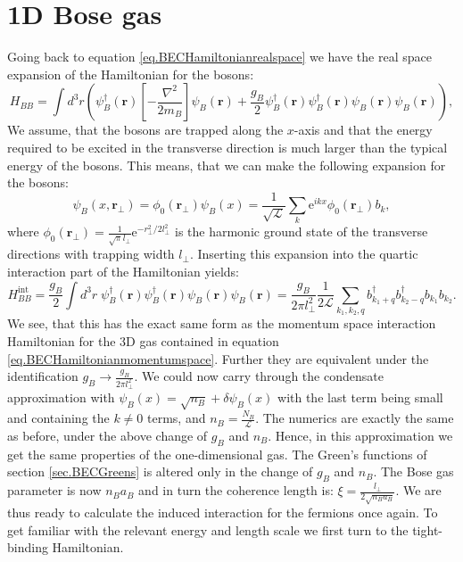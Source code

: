 \section{1D Bose gas} \label{sec.1DBosegas}
Going back to equation \eqref{eq.BECHamiltonianrealspace} we have the real space expansion of the Hamiltonian for the bosons:
\begin{equation}
H_{BB} = \int d^3 r \left(\psi_B^\dagger(\mathbf{r})\left[-\frac{\nabla^2}{2m_B}\right]\psi_B(\mathbf{r}) + \frac{g_B}{2}\psi_B^\dagger(\mathbf{r})\psi_B^\dagger(\mathbf{r})\psi_B(\mathbf{r})\psi_B(\mathbf{r})  \right), \nonumber
\end{equation}
We assume, that the bosons are trapped along the $x$-axis and that the energy required to be excited in the transverse direction is much larger than the typical energy of the bosons. This means, that we can make the following expansion for the bosons:
\begin{equation}
\psi_B(x, \mathbf{r}_{\perp}) = \phi_0(\mathbf{r}_{\perp}) \psi_B(x) = \frac{1}{\sqrt{\mathcal{L}}} \sum_k \text{e}^{ikx} \phi_0(\mathbf{r}_{\perp}) b_k, 
\nonumber
\end{equation}
where $\phi_0(\mathbf{r}_\perp) = \frac{1}{\sqrt{\pi}l_{\perp}}\text{e}^{-r_{\perp}^2/2l_{\perp}^2}$ is the harmonic ground state of the transverse directions with trapping width $l_{\perp}$. Inserting this expansion into the quartic interaction part of the Hamiltonian yields:
\begin{equation}
H_{BB}^{\text{int}} = \frac{g_B}{2}\int d^3 r \; \psi_B^\dagger(\mathbf{r})\psi_B^\dagger(\mathbf{r})\psi_B(\mathbf{r})\psi_B(\mathbf{r}) = \frac{g_B}{2\pi l_{\perp}^2}\frac{1}{2\mathcal{L}}\sum_{k_1,k_2,q} b^\dagger_{k_1 + q}b^\dagger_{k_2 - q}b_{k_1}b_{k_2}. \nonumber
\end{equation}
We see, that this has the exact same form as the momentum space interaction Hamiltonian for the 3D gas contained in equation \eqref{eq.BECHamiltonianmomentumspace}. Further they are equivalent under the identification $g_B \to \frac{g_B}{2\pi l_{\perp}^2}$. We could now carry through the condensate approximation with $\psi_B(x) = \sqrt{n_B} + \delta\psi_B(x)$ with the last term being small and containing the $k \neq 0$ terms, and $n_B = \frac{N_B}{\mathcal{L}}$. The numerics are exactly the same as before, under the above change of $g_B$ and $n_B$. Hence, in this approximation we get the same properties of the one-dimensional gas. The Green's functions of section \ref{sec.BECGreens} is altered only in the change of $g_B$ and $n_B$. The Bose gas parameter is now $n_Ba_B$ and in turn the coherence length is: $\xi = \frac{l_{\perp}}{2\sqrt{n_Ba_B}}$. We are thus ready to calculate the induced interaction for the fermions once again. To get familiar with the relevant energy and length scale we first turn to the tight-binding Hamiltonian.

